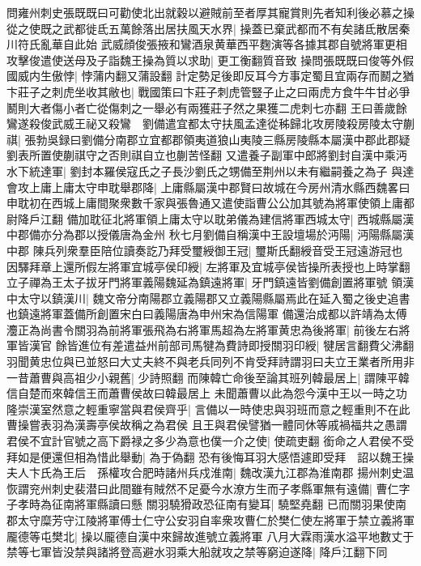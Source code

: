 問雍州刺史張既既曰可勸使北出就穀以避賊前至者厚其寵賞則先者知利後必慕之操從之使既之武都徙氐五萬餘落出居扶風天水界|{
	操蓋已棄武都而不有矣諸氐散居秦川符氏亂華自此始}
武威顔俊張掖和鸞酒泉黄華西平麴演等各據其郡自號將軍更相攻擊俊遣使送母及子詣魏王操為質以求助|{
	更工衡翻質音致}
操問張既既曰俊等外假國威内生傲悖|{
	悖蒲内翻又蒲設翻}
計定勢足後即反耳今方事定蜀且宜兩存而鬭之猶卞莊子之刺虎坐收其敝也|{
	戰國策曰卞莊子刺虎管豎子止之曰兩虎方食牛牛甘必爭鬭則大者傷小者亡從傷刺之一舉必有兩獲莊子然之果獲二虎刺七亦翻}
王曰善歲餘鸞遂殺俊武威王祕又殺鸞　劉備遣宜都太守扶風孟達從秭歸北攻房陵殺房陵太守蒯祺|{
	張勃吳録曰劉備分南郡立宜都郡領夷道狼山夷陵三縣房陵縣本屬漢中郡此郡疑劉表所置使蒯祺守之否則祺自立也蒯苦怪翻}
又遣養子副軍中郎將劉封自漢中乘沔水下統達軍|{
	劉封本羅侯寇氏之子長沙劉氏之甥備至荆州以未有繼嗣養之為子}
與達會攻上庸上庸太守申耽舉郡降|{
	上庸縣屬漢中郡賢曰故城在今房州清水縣西魏畧曰申耽初在西城上庸間聚衆數千家與張魯通又遣使詣曹公公加其號為將軍使領上庸都尉降戶江翻}
備加耽征北將軍領上庸太守以耽弟儀為建信將軍西城太守|{
	西城縣屬漢中郡備亦分為郡以授儀唐為金州}
秋七月劉備自稱漢中王設壇場於沔陽|{
	沔陽縣屬漢中郡}
陳兵列衆羣臣陪位讀奏訖乃拜受璽綬御王冠|{
	璽斯氏翻綬音受王冠遠游冠也}
因驛拜章上還所假左將軍宜城亭侯印綬|{
	左將軍及宜城亭侯皆操所表授也上時掌翻}
立子禪為王太子拔牙門將軍義陽魏延為鎮遠將軍|{
	牙門鎮遠皆劉備創置將軍號}
領漢中太守以鎮漢川|{
	魏文帝分南陽郡立義陽郡又立義陽縣屬焉此在延入蜀之後史追書也鎮遠將軍蓋備所創置宋白曰義陽唐為申州宋為信陽軍}
備還治成都以許靖為太傅灋正為尚書令關羽為前將軍張飛為右將軍馬超為左將軍黄忠為後將軍|{
	前後左右將軍皆漢官}
餘皆進位有差遣益州前部司馬犍為費詩即授關羽印綬|{
	犍居言翻費父沸翻}
羽聞黄忠位與已並怒曰大丈夫終不與老兵同列不肯受拜詩謂羽曰夫立王業者所用非一昔蕭曹與高祖少小親舊|{
	少詩照翻}
而陳韓亡命後至論其班列韓最居上|{
	謂陳平韓信自楚而來韓信王而蕭曹侯故曰韓最居上}
未聞蕭曹以此為怨今漢中王以一時之功隆崇漢室然意之輕重寧當與君侯齊乎|{
	言備以一時使忠與羽班而意之輕重則不在此曹操嘗表羽為漢壽亭侯故稱之為君侯}
且王與君侯譬猶一體同休等戚禍福共之愚謂君侯不宜計官號之高下爵禄之多少為意也僕一介之使|{
	使疏吏翻}
銜命之人君侯不受拜如是便還但相為惜此舉動|{
	為于偽翻}
恐有後悔耳羽大感悟遽即受拜　詔以魏王操夫人卞氏為王后　孫權攻合肥時諸州兵戍淮南|{
	魏改漢九江郡為淮南郡}
揚州刺史温恢謂兖州刺史裴潜曰此間雖有賊然不足憂今水潦方生而子孝縣軍無有遠備|{
	曹仁字子孝時為征南將軍縣讀曰懸}
關羽驍猾政恐征南有變耳|{
	驍堅堯翻}
已而關羽果使南郡太守糜芳守江陵將軍傅士仁守公安羽自率衆攻曹仁於樊仁使左將軍于禁立義將軍龎德等屯樊北|{
	操以龎德自漢中來歸故進號立義將軍}
八月大霖雨漢水溢平地數丈于禁等七軍皆没禁與諸將登高避水羽乘大船就攻之禁等窮迫遂降|{
	降戶江翻下同}
